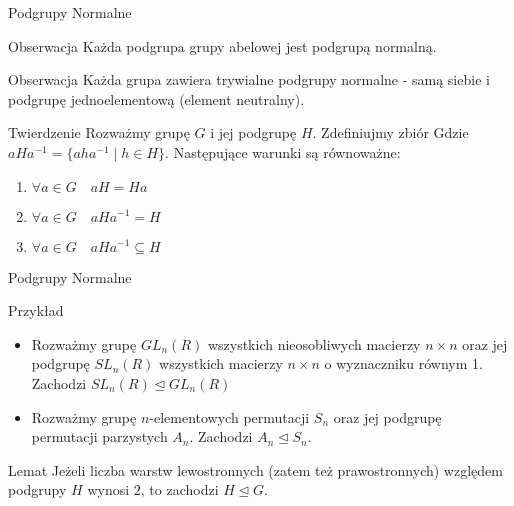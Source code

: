 \documentclass{beamer}
\begin{document}
\begin{frame}{Podgrupy Normalne}
    \begin{alertblock}{Obserwacja}
        Każda podgrupa grupy abelowej jest podgrupą normalną.
    \end{alertblock}
    \pause 
    \begin{alertblock}{Obserwacja}
        Każda grupa zawiera trywialne podgrupy normalne - samą siebie i podgrupę jednoelementową (element neutralny). 
    \end{alertblock}
    \pause 
    \begin{block}{Twierdzenie}
        Rozważmy grupę $G$ i jej podgrupę $H$. Zdefiniujmy zbiór Gdzie $aHa^{-1} = \{aha^{-1} \mid h \in H\}$. Następujące warunki są równoważne:
        \begin{enumerate}
            \item $\forall a \in G \quad aH = Ha$ 
            \item $\forall a \in G \quad aHa^{-1} = H$
            \item $\forall a \in G \quad aHa^{-1} \subseteq H$
        \end{enumerate}
    \end{block}
\end{frame}

\begin{frame}{Podgrupy Normalne}
    \begin{exampleblock}{Przykład}
        \begin{itemize}
            \item Rozważmy grupę $GL_n(R)$ wszystkich nieosobliwych macierzy $n \times n$ oraz jej podgrupę $SL_n(R)$ wszystkich macierzy $n\times n$ o wyznaczniku równym 1. Zachodzi $SL_n(R) \trianglelefteq GL_n(R)$
            \item Rozważmy grupę $n$-elementowych permutacji $S_n$ oraz jej podgrupę permutacji parzystych $A_n$. Zachodzi $A_n \trianglelefteq S_n.$
        \end{itemize}
    \end{exampleblock}
    \pause
    \begin{block}{Lemat}
        Jeżeli liczba warstw lewostronnych (zatem też prawostronnych) względem podgrupy $H$ wynosi $2$, to zachodzi $H \trianglelefteq G$.
    \end{block}
\end{frame}
\end{document}
